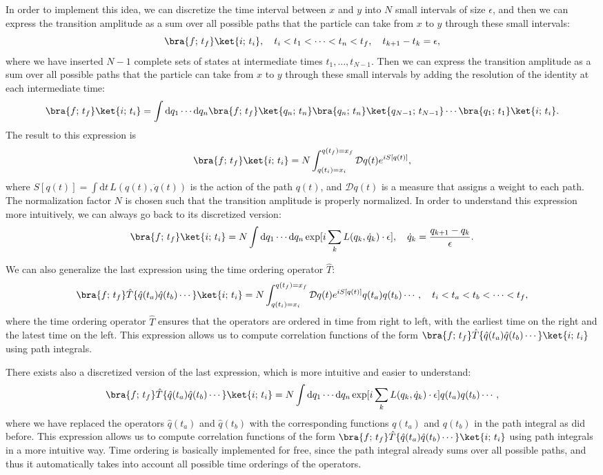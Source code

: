 In order to implement this idea, we can discretize the time interval between \(x\) and \(y\) into \(N\) small intervals of size \(\epsilon\), and then we can express the transition amplitude as a sum over all possible paths that the particle can take from \(x\) to \(y\) through these small intervals:
\[
    \bra{f;\,t_f}\ket{i;\,t_i}, \quad t_i < t_1 < \cdots < t_n < t_f, \quad t_{k+1} - t_k = \epsilon,
\]
where we have inserted \(N-1\) complete sets of states at intermediate times \(t_1, \ldots, t_{N-1}\). Then we can express the transition amplitude as a sum over all possible paths that the particle can take from \(x\) to \(y\) through these small intervals by adding the resolution of the identity at each intermediate time:
\[
    \bra{f;\,t_f}\ket{i;\,t_i} = \int \mathrm{d} q_1 \cdots \mathrm{d}q_n \bra{f;\,t_f}\ket{q_{n};\,t_{n}} \bra{q_{n};\,t_{n}}\ket{q_{N-1};\,t_{N-1}} \cdots \bra{q_1;\,t_1}\ket{i;\,t_i}.
\]
The result to this expression is
\[
    \bra{f;\,t_f}\ket{i;\,t_i} = N \int_{q(t_i) = x_i}^{q(t_f) = x_f} \mathcal{D} q(t) e^{i S[q(t)]},
\]
where \(S[q(t)] = \int \mathrm{d}t \, L(q(t), \dot{q}(t))\) is the action of the path \(q(t)\), and \(\mathcal{D} q(t)\) is a measure that assigns a weight to each path. The normalization factor \(N\) is chosen such that the transition amplitude is properly normalized. In order to understand this expression more intuitively, we can always go back to its discretized version:
\[
    \bra{f;\,t_f}\ket{i;\,t_i} = N \int \mathrm{d} q_1 \cdots \mathrm{d}q_n \exp[i \sum_{k} L(q_k, \dot{q}_{k}) \cdot \epsilon], \quad \dot{q}_k = \frac{q_{k+1} - q_k}{\epsilon}.
\]

We can also generalize the last expression using the time ordering operator \(\hat{T}\):
\[
    \bra{f;\,t_f} \hat{T} \{\hat{q}(t_a) \hat{q}(t_b) \cdots\} \ket{i;\,t_i} = N \int_{q(t_i) = x_i}^{q(t_f) = x_f} \mathcal{D} q(t) e^{i S[q(t)]} q(t_a) q(t_b) \cdots, \quad t_i < t_a < t_b < \cdots < t_f,
\]
where the time ordering operator \(\hat{T}\) ensures that the operators are ordered in time from right to left, with the earliest time on the right and the latest time on the left. This expression allows us to compute correlation functions of the form \(\bra{f;\,t_f} \hat{T} \{\hat{q}(t_a) \hat{q}(t_b) \cdots\} \ket{i;\,t_i}\) using path integrals.

There exists also a discretized version of the last expression, which is more intuitive and easier to understand:
\[
    \bra{f;\,t_f} \hat{T} \{\hat{q}(t_a) \hat{q}(t_b) \cdots\} \ket{i;\,t_i} = N \int \mathrm{d} q_1 \cdots \mathrm{d}q_n \exp[i \sum_{k} L(q_k, \dot{q}_{k}) \cdot \epsilon] q(t_a) q(t_b) \cdots,
\]
where we have replaced the operators \(\hat{q}(t_a)\) and \(\hat{q}(t_b)\) with the corresponding functions \(q(t_a)\) and \(q(t_b)\) in the path integral as did before. This expression allows us to compute correlation functions of the form \(\bra{f;\,t_f} \hat{T} \{\hat{q}(t_a) \hat{q}(t_b) \cdots\} \ket{i;\,t_i}\) using path integrals in a more intuitive way. Time ordering is basically implemented for free, since the path integral already sums over all possible paths, and thus it automatically takes into account all possible time orderings of the operators. 

